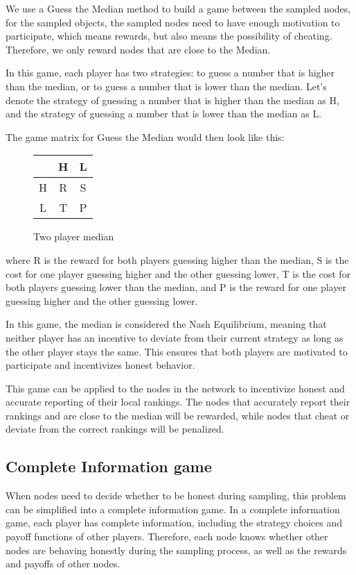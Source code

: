 \documentclass[twocolumn]{article}
\begin{document}
We use a Guess the Median\cite{game_theory} method to build a game between the sampled nodes, for the sampled objects, the sampled nodes need to have enough motivation to participate, which means rewards, but also means the possibility of cheating. Therefore, we only reward nodes that are close to the Median.

In this game, each player has two strategies: to guess a number that is higher than the median, or to guess a number that is lower than the median. Let's denote the strategy of guessing a number that is higher than the median as H, and the strategy of guessing a number that is lower than the median as L.

The game matrix for Guess the Median would then look like this:

\begin{figure}[htbp]
  \begin{center}
    \begin{tabular}{c|cc} & H & L \\ \hline H & R & S \\ L & T & P \\ \end{tabular}
  \end{center}

\caption{Two player median}
\end{figure}

where R is the reward for both players guessing higher than the median, S is the cost for one player guessing higher and the other guessing lower, T is the cost for both players guessing lower than the median, and P is the reward for one player guessing higher and the other guessing lower.

In this game, the median is considered the Nash Equilibrium, meaning that neither player has an incentive to deviate from their current strategy as long as the other player stays the same. This ensures that both players are motivated to participate and incentivizes honest behavior.

This game can be applied to the nodes in the network to incentivize honest and accurate reporting of their local rankings. The nodes that accurately report their rankings and are close to the median will be rewarded, while nodes that cheat or deviate from the correct rankings will be penalized.

\subsection{Complete Information game}
When nodes need to decide whether to be honest during sampling, this problem can be simplified into a complete information game. In a complete information game, each player has complete information, including the strategy choices and payoff functions of other players. Therefore, each node knows whether other nodes are behaving honestly during the sampling process, as well as the rewards and payoffs of other nodes.
\end{document}
